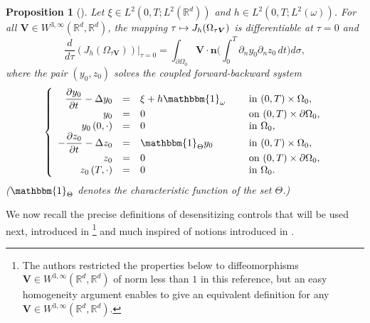 \documentclass[JEP,XML,SOM,Unicode,NoFloatCountersInSection]{cedram}
\newcommand\mto{\mathchoice{\longmapsto}{\mapsto}{\mapsto}{\mapsto}}
\newcommand{\bn}{\boldsymbol{n}}
\newcommand{\bV}{\boldsymbol{V}}
\newcommand\R{{\mathbb R}}
\newtheorem{proposition}[theorem]{Proposition}
\theoremstyle{definition}
\begin{document}
\begin{proposition}[{\cite[Proof of Prop.\,1.1]{Lissy-Privat-Simpore}}]
\label{Prop-J-differentiable}
Let $\xi \in L^2(0,T; L^2(\R^d))$ and $h \in L^2(0,T; L^2(\omega))$. For all $ \bV \in W^{3, \infty} (\R^d, \R^d)$, the mapping $\tau \mto J_h(\Omega_{\tau\bV})$ is differentiable at $\tau = 0$ and
\begin{equation}
\dfrac{d }{d \tau}\left({J}_h\left(\Omega_{\tau\bV} \right)\right)\Big|_{\tau=0}
\label{Diff-J-V-2}
=
\int_{\partial\Omega_0} \bV \cdot \bn \biggl(\int_0^T \partial_n y_0 \partial_n z_0 \, dt\biggr) d\sigma,
\end{equation}
where the pair $(y_0,z_0)$ solves the coupled forward-backward system
\begin{equation}
\label{y-Omega-0-h}
\left\{
\begin{array}{rcll}
\dfrac{\partial y_0}{\partial t}-\Delta y_0 &=&\xi +h\mathbbm{1}_{\omega}\quad&\text{ in }(0,T) \times \Omega_0,
\\
y_0 &=& 0 &\text{ on }(0,T) \times \partial \Omega_0,
\\
y_0\left(0,\cdot\right) &=& 0 &\text{ in }\Omega_0,
\\
-\dfrac{\partial z_0}{\partial t}-\Delta z_0 &=&\mathbbm{1}_{\Theta}y_0 &\text{ in }(0,T) \times \Omega_0,
\\
z_0 &=& 0 &\text{ on }(0,T) \times \partial \Omega_0,
\\
z_0\left(T,\cdot\right) &=& 0 &\text{ in }\Omega_0.
\end{array}
\right.
\end{equation}
($\mathbbm{1}_\Theta$ denotes the characteristic function of the set $\Theta$.)
\end{proposition}

We now recall the precise definitions of desensitizing controls that will be used next, introduced in \cite[Def.\,1.1]{Lissy-Privat-Simpore}\footnote{The authors restricted the properties below to diffeomorphisms \hbox{$\bV \!\in\! W^{3,\infty}(\R^d, \R^d)$} of norm less than $1$ in this reference, but an easy homogeneity argument enables to give an equivalent definition for any $\mathbf V \in W^{3,\infty}(\R^d, \R^d)$.} and much inspired of notions introduced in \cite{Lions-Sentinelles-1992,Bodart-Fabre}.
\end{document}
